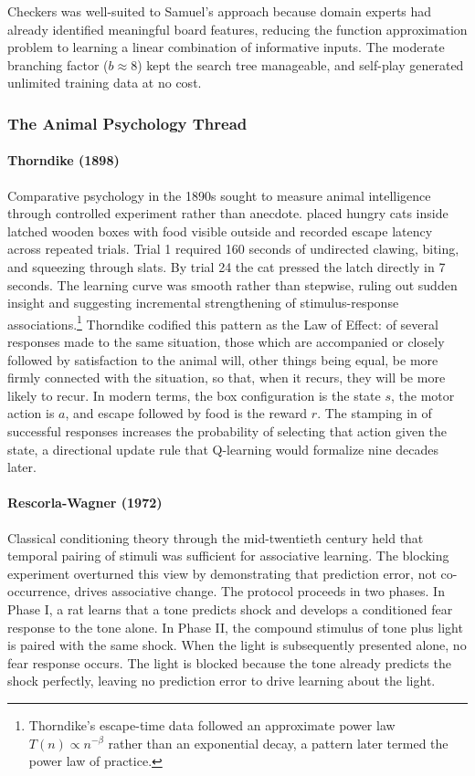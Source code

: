 Checkers was well-suited to Samuel's approach because domain experts had already identified meaningful board features, reducing the function approximation problem to learning a linear combination of informative inputs. The moderate branching factor ($b \approx 8$) kept the search tree manageable, and self-play generated unlimited training data at no cost.


\subsubsection{The Animal Psychology Thread}

\paragraph{Thorndike (1898)}

Comparative psychology in the 1890s sought to measure animal intelligence through controlled experiment rather than anecdote. \citet{Thorndike1898} placed hungry cats inside latched wooden boxes with food visible outside and recorded escape latency across repeated trials. Trial 1 required 160 seconds of undirected clawing, biting, and squeezing through slats. By trial 24 the cat pressed the latch directly in 7 seconds. The learning curve was smooth rather than stepwise, ruling out sudden insight and suggesting incremental strengthening of stimulus-response associations.\footnote{Thorndike's escape-time data followed an approximate power law $T(n) \propto n^{-\beta}$ rather than an exponential decay, a pattern later termed the power law of practice.} Thorndike codified this pattern as the Law of Effect: of several responses made to the same situation, those which are accompanied or closely followed by satisfaction to the animal will, other things being equal, be more firmly connected with the situation, so that, when it recurs, they will be more likely to recur. In modern terms, the box configuration is the state $s$, the motor action is $a$, and escape followed by food is the reward $r$. The stamping in of successful responses increases the probability of selecting that action given the state, a directional update rule that Q-learning would formalize nine decades later.

\paragraph{Rescorla-Wagner (1972)}

Classical conditioning theory through the mid-twentieth century held that temporal pairing of stimuli was sufficient for associative learning. The blocking experiment overturned this view by demonstrating that prediction error, not co-occurrence, drives associative change. The protocol proceeds in two phases. In Phase I, a rat learns that a tone predicts shock and develops a conditioned fear response to the tone alone. In Phase II, the compound stimulus of tone plus light is paired with the same shock. When the light is subsequently presented alone, no fear response occurs. The light is blocked because the tone already predicts the shock perfectly, leaving no prediction error to drive learning about the light.

